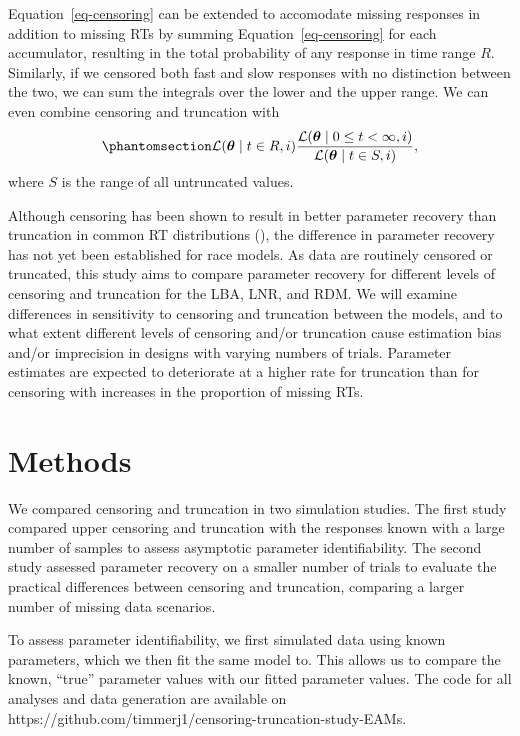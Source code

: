 \documentclass[
  stu,
  floatsintext,
  longtable,
  nolmodern,
  notxfonts,
  notimes,
  draftfirst,
  colorlinks=true,linkcolor=blue,citecolor=blue,urlcolor=blue]{apa7}
\begin{document}
Equation~\ref{eq-censoring} can be extended to accomodate missing
responses in addition to missing RTs by summing
Equation~\ref{eq-censoring} for each accumulator, resulting in the total
probability of any response in time range \(R\). Similarly, if we
censored both fast and slow responses with no distinction between the
two, we can sum the integrals over the lower and the upper range. We can
even combine censoring and truncation with
\begin{equation}\phantomsection\label{eq-censoringandtruncation}{
\mathcal{L}(\boldsymbol{\theta} \mid t \in R, i) \frac{\mathcal{L}(\boldsymbol{\theta} \mid 0 \leq t < \infty, i)}{\mathcal{L}(\boldsymbol{\theta} \mid t \in S, i)},
}\end{equation} where \(S\) is the range of all untruncated values.

Although censoring has been shown to result in better parameter recovery
than truncation in common RT distributions
(), the difference in
parameter recovery has not yet been established for race models. As data
are routinely censored or truncated, this study aims to compare
parameter recovery for different levels of censoring and truncation for
the LBA, LNR, and RDM. We will examine differences in sensitivity to
censoring and truncation between the models, and to what extent
different levels of censoring and/or truncation cause estimation bias
and/or imprecision in designs with varying numbers of trials. Parameter
estimates are expected to deteriorate at a higher rate for truncation
than for censoring with increases in the proportion of missing RTs.

\section{Methods}\label{methods}

We compared censoring and truncation in two simulation studies. The
first study compared upper censoring and truncation with the responses
known with a large number of samples to assess asymptotic parameter
identifiability. The second study assessed parameter recovery on a
smaller number of trials to evaluate the practical differences between
censoring and truncation, comparing a larger number of missing data
scenarios.

To assess parameter identifiability, we first simulated data using known
parameters, which we then fit the same model to. This allows us to
compare the known, ``true'' parameter values with our fitted parameter
values. The code for all analyses and data generation are available on
https://github.com/timmerj1/censoring-truncation-study-EAMs.
\end{document}
